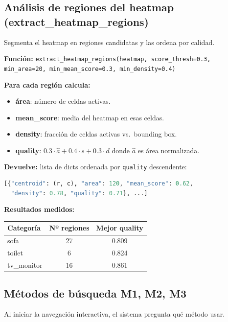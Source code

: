 \documentclass[11pt,a4paper]{article}
\begin{document}
\subsection{Análisis de regiones del heatmap (extract\_heatmap\_regions)}

Segmenta el heatmap en regiones candidatas y las ordena por calidad.

\textbf{Función:} \texttt{extract\_heatmap\_regions(heatmap, score\_thresh=0.3,
min\_area=20, min\_mean\_score=0.3, min\_density=0.4)}

\textbf{Para cada región calcula:}
\begin{itemize}
  \item \textbf{área}: número de celdas activas.
  \item \textbf{mean\_score}: media del heatmap en esas celdas.
  \item \textbf{density}: fracción de celdas activas vs.\ bounding box.
  \item \textbf{quality}: $0.3 \cdot \hat{a} + 0.4 \cdot \bar{s} + 0.3 \cdot d$
        donde $\hat{a}$ es área normalizada.
\end{itemize}

\textbf{Devuelve:} lista de dicts ordenada por \texttt{quality} descendente:
\begin{lstlisting}[language=Python]
[{"centroid": (r, c), "area": 120, "mean_score": 0.62,
  "density": 0.78, "quality": 0.71}, ...]
\end{lstlisting}

\textbf{Resultados medidos:}
\begin{center}
\begin{tabular}{lcc}
\toprule
Categoría & Nº regiones & Mejor quality \\
\midrule
sofa       & 27 & 0.809 \\
toilet     &  6 & 0.824 \\
tv\_monitor & 16 & 0.861 \\
\bottomrule
\end{tabular}
\end{center}

\subsection{Métodos de búsqueda M1, M2, M3}

Al iniciar la navegación interactiva, el sistema pregunta qué método usar.
\end{document}
